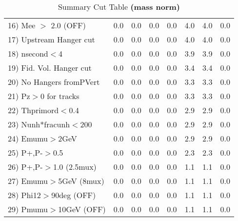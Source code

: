 \begin{table}[h!]
{{\begin{tabular}{||l||r|r|r|r|r||r||r||}
 16) Mee $>$ 2.0  (OFF)   &       0.0 &       0.0 &       0.0 &       0.0 &       4.0 &       4.0 &       0.0 \\
 17) Upstream Hanger cut  &       0.0 &       0.0 &       0.0 &       0.0 &       4.0 &       4.0 &       0.0 \\
 18) nsecond$<$4          &       0.0 &       0.0 &       0.0 &       0.0 &       3.9 &       3.9 &       0.0 \\
 19) Fid. Vol. Hanger cut &       0.0 &       0.0 &       0.0 &       0.0 &       3.4 &       3.4 &       0.0 \\
 20) No Hangers fromPVert &       0.0 &       0.0 &       0.0 &       0.0 &       3.3 &       3.3 &       0.0 \\
 21) Pz$>$0 for tracks    &       0.0 &       0.0 &       0.0 &       0.0 &       3.3 &       3.3 &       0.0 \\
 22) Thprimord$<$0.4      &       0.0 &       0.0 &       0.0 &       0.0 &       2.9 &       2.9 &       0.0 \\
 23) Nunh*fracunh$<$200   &       0.0 &       0.0 &       0.0 &       0.0 &       2.9 &       2.9 &       0.0 \\
 24) Emumu$>$2GeV         &       0.0 &       0.0 &       0.0 &       0.0 &       2.9 &       2.9 &       0.0 \\
 25) P+,P-$>$0.5          &       0.0 &       0.0 &       0.0 &       0.0 &       2.3 &       2.3 &       0.0 \\
 26) P+,P-$>$1.0 (2.5mux) &       0.0 &       0.0 &       0.0 &       0.0 &       1.1 &       1.1 &       0.0 \\
 27) Emumu$>$5GeV  (8mux) &       0.0 &       0.0 &       0.0 &       0.0 &       1.1 &       1.1 &       0.0 \\
 28) Phi12$>$90deg  (OFF) &       0.0 &       0.0 &       0.0 &       0.0 &       1.1 &       1.1 &       0.0 \\
 29) Pmumu$>$10GeV  (OFF) &       0.0 &       0.0 &       0.0 &       0.0 &       1.1 &       1.1 &       0.0 \\
 \hline
 \hline
 \end{tabular}
 \caption{Summary Cut Table \textbf{ (mass norm) }}
 \label{tab-sumcut}
 }}
 \end{table}
 \endinput
